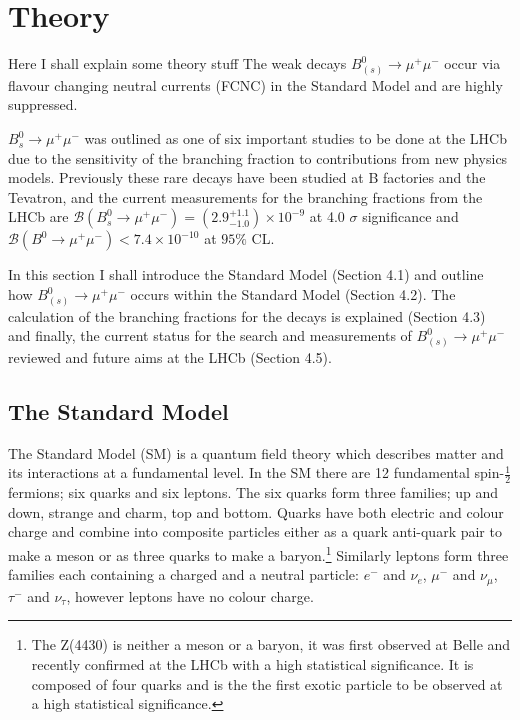 

\chapter{Theory}


Here I shall explain some theory stuff
The weak decays $B_{(s)}^{0} \to \mu^{+} \mu^{-}$ occur via flavour changing neutral currents (FCNC) in the Standard Model and are highly suppressed. 


$B_{s}^{0} \to \mu^{+} \mu^{-}$ was outlined as one of six important studies to be done at the LHCb \cite{RoadMap} due to the sensitivity of the branching fraction to contributions from new physics models.
Previously these rare decays have been studied at B factories and the Tevatron, and the current measurements for the branching fractions from the LHCb are 
$ \mathcal{B}(B_{s}^{0} \to \mu^{+} \mu^{-})  = (2.9_{-1.0}^{+1.1})\times 10^{-9}$ at 4.0 $\sigma$ significance and $ \mathcal{B}(B^{0} \to \mu^{+} \mu^{-}) < 7.4 \times 10^{-10}$ at $95\%$ CL.

In this section I shall introduce the Standard Model (Section 4.1) and outline how $B_{(s)}^{0} \to \mu^{+} \mu^{-}$ occurs within the Standard Model (Section 4.2). 
The calculation of the branching fractions for the decays is explained (Section 4.3) and finally, the current 
status for the search and measurements of  $B_{(s)}^{0} \to \mu^{+} \mu^{-}$ reviewed and future aims at the LHCb (Section 4.5).



\section{The Standard Model}

The Standard Model (SM) is a quantum field theory which describes matter and its interactions at a fundamental level. In the SM there are 12 fundamental spin-$\frac{1}{2}$ fermions; six quarks and six leptons. The six quarks form three families; up and down, strange and charm, top and bottom. Quarks have both electric and colour charge and combine into composite
particles either as a quark anti-quark pair to make a meson or as three quarks to make a baryon.\footnote{The Z(4430) is neither a meson or a baryon, it was first observed at Belle \cite{Choi:2007wga} and recently confirmed at the LHCb \cite{Aaij:2014jqa} with a 
high statistical significance. It is composed of four quarks and is the the first exotic particle to be observed at a high statistical significance.} Similarly leptons form three families each containing a charged and a neutral particle: $e^{-}$ 
and $\nu_{e}$, $\mu^{-}$ and $\nu_{\mu}$, $\tau^{-}$ and $\nu_{\tau}$, however leptons have no colour charge. 

